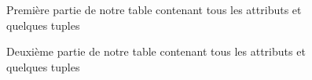 \documentclass[a4paper,sffamily,12pt]{article}
\begin{document}
				\begin{figure}[!h]		
					\centering
					\caption{Première partie de notre table contenant tous les attributs et quelques tuples}
					\label{table_p1}	
				\end{figure}			

				\begin{figure}[!h]
					\centering						
					\caption{Deuxième partie de notre table contenant tous les attributs et quelques tuples}
					\label{table_p2}	
				\end{figure}			
\end{document}
